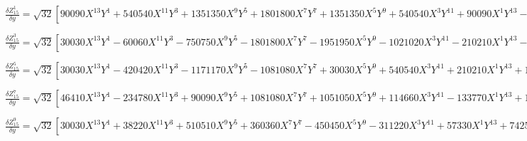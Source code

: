 \documentclass[10pt,landscape]{article}
\begin{document}
\vspace{1.2 mm}
\noindent $ \frac{\delta Z^{1}_{15}}{\delta y} = \sqrt{32} [90090X^{13}Y^{1} +540540X^{11}Y^{3} +1351350X^{9}Y^{5} +1801800X^{7}Y^{7} +1351350X^{5}Y^{9} +540540X^{3}Y^{11} +90090X^{1}Y^{13} -288288X^{11}Y^{1} -1441440X^{9}Y^{3} -2882880X^{7}Y^{5} -2882880X^{5}Y^{7} -1441440X^{3}Y^{9} -288288X^{1}Y^{11} +360360X^{9}Y^{1} +1441440X^{7}Y^{3} +2162160X^{5}Y^{5} +1441440X^{3}Y^{7} +360360X^{1}Y^{9} -221760X^{7}Y^{1} -665280X^{5}Y^{3} -665280X^{3}Y^{5} -221760X^{1}Y^{7} +69300X^{5}Y^{1} +138600X^{3}Y^{3} +69300X^{1}Y^{5} -10080X^{3}Y^{1} -10080X^{1}Y^{3} +504X^{1}Y^{1}] $

\vspace{1.2 mm}
\noindent $ \frac{\delta Z^{3}_{15}}{\delta y} = \sqrt{32} [30030X^{13}Y^{1} -60060X^{11}Y^{3} -750750X^{9}Y^{5} -1801800X^{7}Y^{7} -1951950X^{5}Y^{9} -1021020X^{3}Y^{11} -210210X^{1}Y^{13} -72072X^{11}Y^{1} +360360X^{9}Y^{3} +2162160X^{7}Y^{5} +3603600X^{5}Y^{7} +2522520X^{3}Y^{9} +648648X^{1}Y^{11} +51480X^{9}Y^{1} -617760X^{7}Y^{3} -2162160X^{5}Y^{5} -2265120X^{3}Y^{7} -772200X^{1}Y^{9} +443520X^{5}Y^{3} +887040X^{3}Y^{5} +443520X^{1}Y^{7} -13860X^{5}Y^{1} -138600X^{3}Y^{3} -124740X^{1}Y^{5} +5040X^{3}Y^{1} +15120X^{1}Y^{3} -504X^{1}Y^{1}] $

\vspace{1.2 mm}
\noindent $ \frac{\delta Z^{5}_{15}}{\delta y} = \sqrt{32} [30030X^{13}Y^{1} -420420X^{11}Y^{3} -1171170X^{9}Y^{5} -1081080X^{7}Y^{7} +30030X^{5}Y^{9} +540540X^{3}Y^{11} +210210X^{1}Y^{13} +120120X^{11}Y^{1} +1161160X^{9}Y^{3} +2162160X^{7}Y^{5} +720720X^{5}Y^{7} -1001000X^{3}Y^{9} -600600X^{1}Y^{11} -180180X^{9}Y^{1} -1132560X^{7}Y^{3} -1081080X^{5}Y^{5} +514800X^{3}Y^{7} +643500X^{1}Y^{9} +126720X^{7}Y^{1} +443520X^{5}Y^{3} -316800X^{1}Y^{7} -41580X^{5}Y^{1} -46200X^{3}Y^{3} +69300X^{1}Y^{5} +5040X^{3}Y^{1} -5040X^{1}Y^{3}] $

\vspace{1.2 mm}
\noindent $ \frac{\delta Z^{7}_{15}}{\delta y} = \sqrt{32} [46410X^{13}Y^{1} -234780X^{11}Y^{3} +90090X^{9}Y^{5} +1081080X^{7}Y^{7} +1051050X^{5}Y^{9} +114660X^{3}Y^{11} -133770X^{1}Y^{13} +144144X^{11}Y^{1} +400400X^{9}Y^{3} -864864X^{7}Y^{5} -2018016X^{5}Y^{7} -560560X^{3}Y^{9} +336336X^{1}Y^{11} -163020X^{9}Y^{1} -102960X^{7}Y^{3} +1081080X^{5}Y^{5} +720720X^{3}Y^{7} -300300X^{1}Y^{9} +79200X^{7}Y^{1} -110880X^{5}Y^{3} -332640X^{3}Y^{5} +110880X^{1}Y^{7} -13860X^{5}Y^{1} +46200X^{3}Y^{3} -13860X^{1}Y^{5}] $

\vspace{1.2 mm}
\noindent $ \frac{\delta Z^{9}_{15}}{\delta y} = \sqrt{32} [30030X^{13}Y^{1} +38220X^{11}Y^{3} +510510X^{9}Y^{5} +360360X^{7}Y^{7} -450450X^{5}Y^{9} -311220X^{3}Y^{11} +57330X^{1}Y^{13} +74256X^{11}Y^{1} -240240X^{9}Y^{3} -864864X^{7}Y^{5} +288288X^{5}Y^{7} +720720X^{3}Y^{9} -117936X^{1}Y^{11} -60060X^{9}Y^{1} +308880X^{7}Y^{3} +216216X^{5}Y^{5} -514800X^{3}Y^{7} +77220X^{1}Y^{9} +15840X^{7}Y^{1} -110880X^{5}Y^{3} +110880X^{3}Y^{5} -15840X^{1}Y^{7}] $
\end{document}
